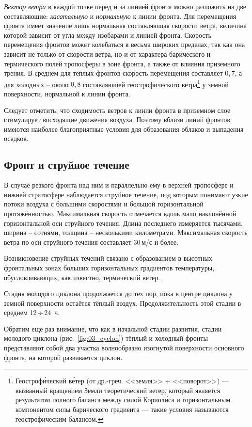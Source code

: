 \documentclass[a4paper, 12pt, twoside, final, book, russian, fittopage, cyremdash, openright]{ncc}
\newcommand{\mps}{\,м/с\xspace}
\newcommand{\otdo}{\,\ensuremath{\div}\,}
\begin{document}
\textit{Вектор ветра} в каждой точке перед и за линией фронта можно
разложить на две составляющие: \textit{касательную} и
\textit{нормальную} к линии фронта. Для перемещения фронта имеет
значение лишь нормальная составляющая скорости ветра, величина которой
зависит от угла между изобарами и линией фронта. Скорость перемещения
фронтов может колебаться в весьма широких пределах, так как она
зависит не только от скорости ветра, но и от характера барического и
термического полей тропосферы в зоне фронта, а также от влияния
приземного трения. В среднем для тёплых фронтов скорость перемещения
составляет $0,7$, а для холодных \--- около $0,8$ составляющей
геострофического ветра\footnote{Геостроф\'{и}ческий в\'{е}тер (от
  др.-греч. <<земля>> + <<поворот>>) — вызванный вращением Земли
  теоретический ветер, который является результатом полного баланса
  между силой Кориол\'{и}са и горизонтальным компонентом силы
  барического градиента — такие условия называются геострофическим
  балансом.}  у земной поверхности, нормальной к линии фронта.

Следует отметить, что сходимость ветров к линии фронта в приземном
слое стимулирует восходящие движения воздуха. Поэтому вблизи линий
фронтов имеются наиболее благоприятные условия для образования облаков
и выпадения осадков.

\subsection{Фронт и струйное течение}
\label{sec:front_and_stream}

В случае резкого фронта над ним и параллельно ему в верхней тропосфере
и нижней стратосфере наблюдается струйное течение, под которым
понимают узкие потоки воздуха с большими скоростями и большой
горизонтальной протяжённостью. Максимальная скорость отмечается вдоль
мало наклонённой горизонтальной оси струйного течения. Длина
последнего измеряется тысячами, ширина \--- сотнями, толщина \---
несколькими километрами. Максимальная скорость ветра по оси струйного
течения составляет 30\mps{} и более.

Возникновение струйных течений связано с образованием в высотных
фронтальных зонах больших горизонтальных градиентов температуры,
обусловливающих, как известно, термический ветер.

Стадия молодого циклона продолжается до тех пор, пока в центре циклона
у земной поверхности остаётся тёплый воздух. Продолжительность этой
стадии в среднем 12\otdo{}24~ч.

Обратим ещё раз внимание, что как в начальной стадии развития, стадии
молодого циклона (рис.~\ref{fig:03_cyclon}) тёплый и холодный фронты представляют собой два
участка волнообразно изогнутой поверхности основного фронта, на
которой развивается циклон.
\end{document}

